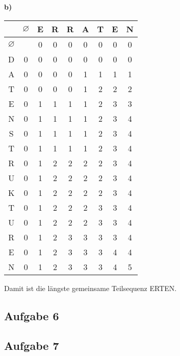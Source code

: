 \documentclass[a4paper,graphics,11pt]{article}
\newcommand{\aufgabe}[1]{\subsection*{Aufgabe #1}}
\begin{document}
\textbf{b)}

\begin{center}
\begin{tabular}{c|*{7}{c|}c}
    & $\varnothing$ & E & R & R & A & T & E & N\\
    \hline
    $\varnothing$ & & 0 & 0 & 0 & 0 & 0 & 0 & 0\\
    \hline
    D & 0 & 0 & 0 & 0 & 0 & 0 & 0 & 0\\
    \hline
    A & 0 & 0 & 0 & 0 & 1 & 1 & 1 & 1\\
    \hline
    T & 0 & 0 & 0 & 0 & 1 & 2 & 2 & 2\\
    \hline
    E & 0 & 1 & 1 & 1 & 1 & 2 & 3 & 3\\
    \hline
    N & 0 & 1 & 1 & 1 & 1 & 2 & 3 & 4\\
    \hline
    S & 0 & 1 & 1 & 1 & 1 & 2 & 3 & 4\\
    \hline
    T & 0 & 1 & 1 & 1 & 1 & 2 & 3 & 4\\
    \hline
    R & 0 & 1 & 2 & 2 & 2 & 2 & 3 & 4\\
    \hline
    U & 0 & 1 & 2 & 2 & 2 & 2 & 3 & 4\\
    \hline
    K & 0 & 1 & 2 & 2 & 2 & 2 & 3 & 4\\
    \hline
    T & 0 & 1 & 2 & 2 & 2 & 3 & 3 & 4\\
    \hline
    U & 0 & 1 & 2 & 2 & 2 & 3 & 3 & 4\\
    \hline
    R & 0 & 1 & 2 & 3 & 3 & 3 & 3 & 4\\
    \hline
    E & 0 & 1 & 2 & 3 & 3 & 3 & 4 & 4\\
    \hline
    N & 0 & 1 & 2 & 3 & 3 & 3 & 4 & 5\\
\end{tabular}
\end{center}
Damit ist die längste gemeinsame Teilsequenz ERTEN.

\newpage

\aufgabe{6}

\newpage

\aufgabe{7}
\end{document}

